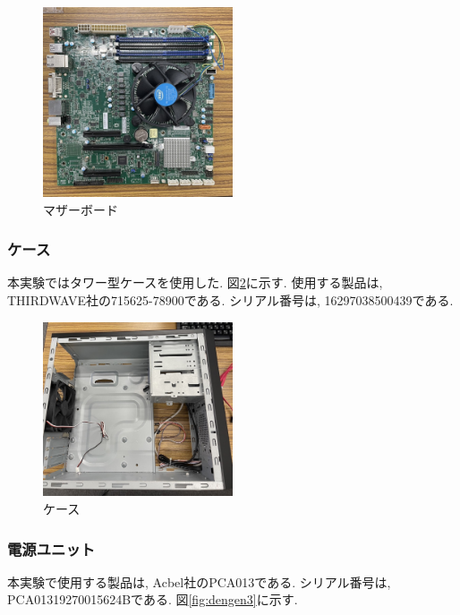 \documentclass{ltjsarticle} %
\begin{document}
\begin{figure}[H] %
  \centering
  \includegraphics[width=0.5\textwidth]{mother1.jpg} %
  \caption{マザーボード} %
  \label{fig:mother1} %
\end{figure}

\subsubsection{ケース}
本実験ではタワー型ケースを使用した. 図\ref{fig:case1}に示す.
使用する製品は, THIRDWAVE社の715625-78900である. シリアル番号は, 16297038500439である. 

\begin{figure}[H] %
  \centering
  \includegraphics[width=0.5\textwidth]{case1.jpg} %
  \caption{ケース} %
  \label{fig:case1} %
\end{figure}

\subsubsection{電源ユニット}
本実験で使用する製品は,  Acbel社のPCA013である. シリアル番号は, PCA01319270015624Bである. 図\ref{fig:dengen3}に示す.
\end{document}
